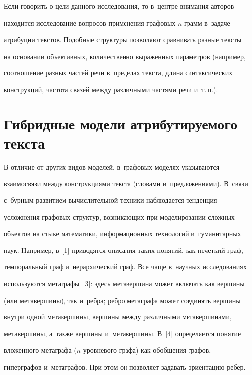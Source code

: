   


  Если говорить о цели данного исследования, то в~центре внимания авторов 


находится исследование вопросов применения графовых $n$-грамм в~задаче 


атрибуции текстов. Подобные структуры позволяют сравнивать разные тексты 


на основании объективных, количественно выраженных параметров (например, 


соотношение разных частей речи в~пределах текста, длина синтаксических 


конструкций, частота связей между различными частями речи и~т.\,п.).


  





\section{Гибридные модели атрибутируемого текста}





  В отличие от других видов моделей, в~графовых моделях указываются 


взаимосвязи между конструкциями текста (словами и~предложениями). В~связи 


с~бурным развитием вычислительной техники наблюдается тенденция 


усложнения графовых структур, возникающих при моделировании сложных 


объектов на стыке математики, информационных технологий и~гуманитарных 


наук. Например, в~[1] приводятся описания таких понятий, как нечеткий граф, 


темпоральный граф и~иерархический граф. Все чаще в~научных исследованиях 


используются метаграфы~[3]: здесь метавершина может включать как вершины 


(или метавершины), так и~ребра; ребро метаграфа может соединять вершины 


внутри одной метавершины, вершины между различными метавершинами, 


метавершины, а~также вершины и~метавершины. В~[4] определяется понятие 


вложенного метаграфа ($n$-уров\-не\-во\-го графа) как обобщения графов, 


гиперграфов и~метаграфов. При этом он позволяет задавать ориентацию ребер.


